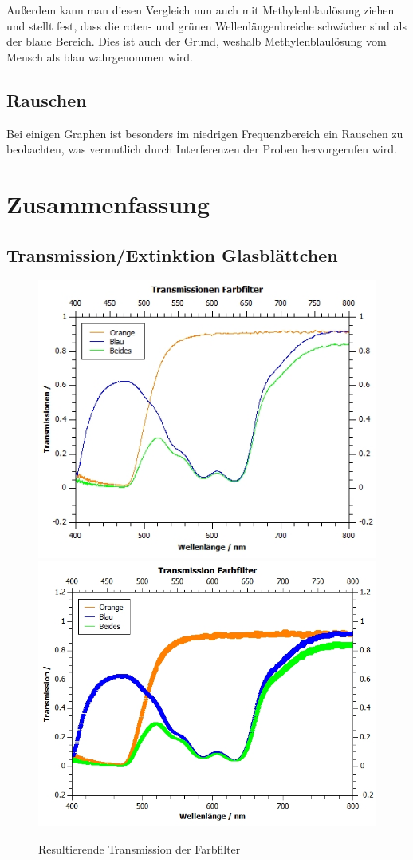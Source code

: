 \documentclass[12pt,a4paper,twoside]{article}
\begin{document}
\noindent
Außerdem kann man diesen Vergleich nun auch mit Methylenblaulösung ziehen und stellt fest, dass die roten- und grünen Wellenlängenbreiche schwächer sind als der blaue Bereich. Dies ist auch der Grund, weshalb Methylenblaulösung vom Mensch als blau wahrgenommen wird.  


\subsection{Rauschen}
Bei einigen Graphen ist besonders im niedrigen Frequenzbereich ein Rauschen zu beobachten, was vermutlich durch Interferenzen der Proben hervorgerufen wird. 



\section{Zusammenfassung} %

\subsection{Transmission/Extinktion Glasblättchen}

\begin{figure}[H]
    \centering
    \includegraphics[width=0.4\linewidth]{nudes/qti-Transmission-FarbfilterOU.jpg}
    \includegraphics[width=0.4\linewidth]{nudes/qti-Transmission-Farbfilter.jpg}
    \caption{Resultierende Transmission der Farbfilter}
    \label{fig:TransmissionFarbfilterAW}
\end{figure}
\end{document}
